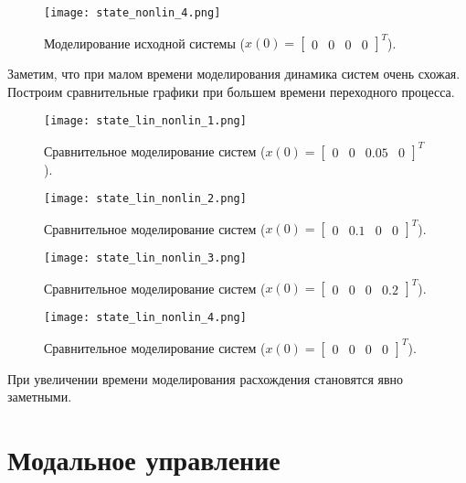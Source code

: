 \begin{figure}[]
    \centering
    \texttt{[image: state\_nonlin\_4.png]}
    \caption{\label{fig:task2_4_4}Моделирование исходной системы ($x(0)=\begin{bmatrix}
        0 & 0 & 0 & 0
    \end{bmatrix}^T$).}
\end{figure}
\pagebreak
Заметим, что при малом времени моделирования динамика систем очень схожая. Построим сравнительные графики при большем времени переходного процесса.

\begin{figure}[]
    \centering
    \texttt{[image: state\_lin\_nonlin\_1.png]}
    \caption{\label{fig:task2_4_5}Сравнительное моделирование систем ($x(0)=\begin{bmatrix}
        0 & 0 & 0.05 & 0
    \end{bmatrix}^T$).}
\end{figure}

\begin{figure}[]
    \centering
    \texttt{[image: state\_lin\_nonlin\_2.png]}
    \caption{\label{fig:task2_4_6}Сравнительное моделирование систем ($x(0)=\begin{bmatrix}
        0 & 0.1 & 0 & 0
    \end{bmatrix}^T$).}
\end{figure}

\begin{figure}[]
    \centering
    \texttt{[image: state\_lin\_nonlin\_3.png]}
    \caption{\label{fig:task2_4_7}Сравнительное моделирование систем ($x(0)=\begin{bmatrix}
        0 & 0 & 0 & 0.2
    \end{bmatrix}^T$).}
\end{figure}

\begin{figure}[]
    \centering
    \texttt{[image: state\_lin\_nonlin\_4.png]}
    \caption{\label{fig:task2_4_8}Сравнительное моделирование систем ($x(0)=\begin{bmatrix}
        0 & 0 & 0 & 0
    \end{bmatrix}^T$).}
\end{figure}

\pagebreak
При увеличении времени моделирования расхождения становятся явно заметными.

\section{Модальное управление}